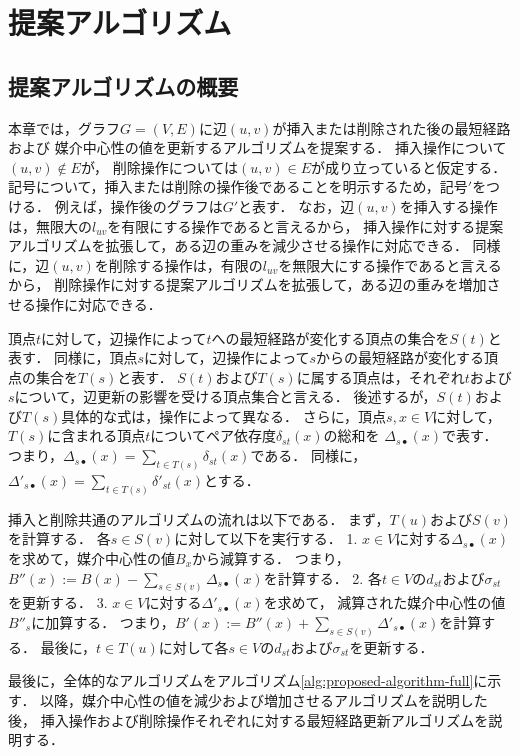\chapter{提案アルゴリズム}
\label{chap:algorithm}

\section{提案アルゴリズムの概要}

本章では，グラフ$G=(V,E)$に辺$(u,v)$が挿入または削除された後の最短経路および
媒介中心性の値を更新するアルゴリズムを提案する．
挿入操作について$(u,v)\notin E$が，
削除操作については$(u,v)\in E$が成り立っていると仮定する．
記号について，挿入または削除の操作後であることを明示するため，記号$'$をつける．
例えば，操作後のグラフは$G'$と表す．
なお，辺$(u,v)$を挿入する操作は，無限大の$l_{uv}$を有限にする操作であると言えるから，
挿入操作に対する提案アルゴリズムを拡張して，ある辺の重みを減少させる操作に対応できる．
同様に，辺$(u,v)$を削除する操作は，有限の$l_{uv}$を無限大にする操作であると言えるから，
削除操作に対する提案アルゴリズムを拡張して，ある辺の重みを増加させる操作に対応できる．

頂点$t$に対して，辺操作によって$t$への最短経路が変化する頂点の集合を$S(t)$と表す．
同様に，頂点$s$に対して，辺操作によって$s$からの最短経路が変化する頂点の集合を$T(s)$と表す．
$S(t)$および$T(s)$に属する頂点は，それぞれ$t$および$s$について，辺更新の影響を受ける頂点集合と言える．
後述するが，$S(t)$および$T(s)$具体的な式は，操作によって異なる．
さらに，頂点$s,x\in V$に対して，$T(s)$に含まれる頂点$t$についてペア依存度$\delta_{st}(x)$の総和を
$\Delta_{s\bullet}(x)$で表す\cite{Bergamini2017}．
つまり，$\Delta_{s\bullet}(x)=\sum_{t\in T(s)}\delta_{st}(x)$である．
同様に，$\Delta'_{s\bullet}(x)=\sum_{t\in T(s)}\delta'_{st}(x)$とする．

挿入と削除共通のアルゴリズムの流れは以下である．
まず，$T(u)$および$S(v)$を計算する．
各$s\in S(v)$に対して以下を実行する．
1. $x\in V$に対する$\Delta_{s\bullet}(x)$を求めて，媒介中心性の値$B_x$から減算する．
つまり，$B''(x):=B(x)-\sum_{s\in S(v)}\Delta_{s\bullet}(x)$を計算する．
2. 各$t\in V$の$d_{st}$および$\sigma_{st}$を更新する．
3. $x\in V$に対する$\Delta'_{s\bullet}(x)$を求めて，
減算された媒介中心性の値$B''_s$に加算する．
つまり，$B'(x):=B''(x)+\sum_{s\in S(v)}\Delta'_{s\bullet}(x)$を計算する．
最後に，$t\in T(u)$に対して各$s\in V$の$d_{st}$および$\sigma_{st}$を更新する．

最後に，全体的なアルゴリズムをアルゴリズム\ref{alg:proposed-algorithm-full}に示す．
以降，媒介中心性の値を減少および増加させるアルゴリズムを説明した後，
挿入操作および削除操作それぞれに対する最短経路更新アルゴリズムを説明する．


